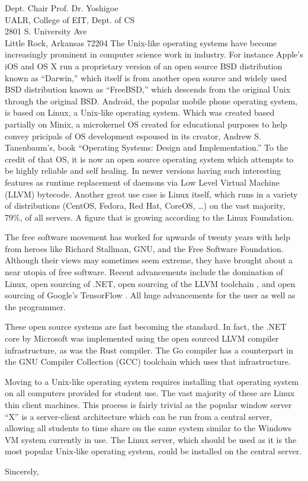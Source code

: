 \documentclass{letter}
\begin{document}
\begin{letter}{
    Dept. Chair Prof. Dr. Yoshigoe \\
    UALR, College of EIT, Dept. of CS \\
    2801 S. University Ave \\
    Little Rock, Arkansas 72204
  }
    The Unix-like operating systems have become increasingly prominent in computer science work in industry. For instance Apple's iOS and OS X run a proprietary version of an open source BSD distribution known as ``Darwin,'' which itself is from another open source and widely used BSD distribution known as ``FreeBSD,'' which descends from the original Unix through the original BSD. Android, the popular mobile phone operating system, is based on Linux, a Unix-like operating system. Which was created based partially on Minix, a microkernel OS created for educational purposes to help convey pricipals of OS development espoused in its creator, Andrew S. Tanenbaum's, book ``Operating Systems: Design and Implementation.'' To the credit of that OS, it is now an open source operating system which attempts to be highly reliable and self healing. In newer versions having such interesting features as runtime replacement of daemons via Low Level Virtual Machine (LLVM) bytecode. Another great use case is Linux itself, which runs in a variety of distributions (CentOS, Fedora, Red Hat, CoreOS, \ldots) on the vast majority, 79\%, of all servers. A figure that is growing according to the Linux Foundation.

    The free software movement has worked for upwards of twenty years with help from heroes like Richard Stallman, GNU, and the Free Software Foundation. Although their views may sometimes seem extreme, they have brought about a near utopia of free software. Recent advancements include the domination of Linux, open sourcing of .NET, open sourcing of the LLVM toolchain \cite{LLVMComp}, and open sourcing of Google's TensorFlow \cite{WiredTensorFlow}. All huge advancements for the user as well as the programmer.

    These open source systems are fast becoming the standard. In fact, the .NET core by Microsoft was implemented using the open sourced LLVM compiler infrastructure, as was the Rust compiler. The Go compiler has a counterpart in the GNU Compiler Collection (GCC) toolchain which uses that infrastructure.

    Moving to a Unix-like operating system requires installing that operating system on all computers provided for student use. The vast majority of these are Linux thin client machines. This process is fairly trivial as the popular window server ``X'' is a server-client architecture which can be run from a central server, allowing all students to time share on the same system similar to the Windows VM system currently in use. The Linux server, which should be used as it is the most popular Unix-like operating system, could be installed on the central server.

    \closing{Sincerely,}

  \end{letter}

  \printglossaries
  \printbibliography
\end{document}
